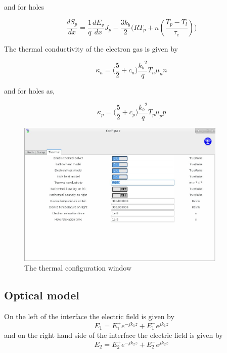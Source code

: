 \documentclass[11pt]{article}
\begin{document}
and for holes

\begin{equation}
\frac{dS_{p}}{dx}=\frac{1}{q}\frac{dE_{v}}{dx} J_{p}-\frac{3 k_{b}}{2} \Bigg( R T_{p}+ n(\frac{T_{p}-T_{l}}{\tau_{e}}) \Bigg)
\end{equation}

The thermal conductivity of the electron gas is given by

\begin{equation}
\kappa_{n}=\Bigg ( \frac{5}{2} +c_n\Bigg) \frac{{k_{b}}^2}{q} T_{n} \mu_n n
\end{equation}

and for holes as,

\begin{equation}
\kappa_{p}=\Bigg ( \frac{5}{2} +c_p\Bigg) \frac{{k_{b}}^2}{q} T_{p} \mu_p p
\end{equation}


\begin{figure}[!htb]
\centering
\includegraphics[width=100mm]{./images/thermal.jpg}
{\caption{The thermal configuration window}}
\label{fig:thermal}
\end{figure}

\subsection{Optical model}
On the left of the interface the electric field is given by
\begin{equation}
E_{1}=E^{+}_{1} e^{-j k_1 z}+E^{-}_{1} e^{j k_1 z}
\label{efield1}
\end{equation}
and on the right hand side of the interface the electric field is given by
\begin{equation}
E_{2}=E^{+}_{2} e^{-j k_2 z}+E^{-}_{2} e^{j k_2 z}
\label{efield2}
\end{equation}
\end{document}
